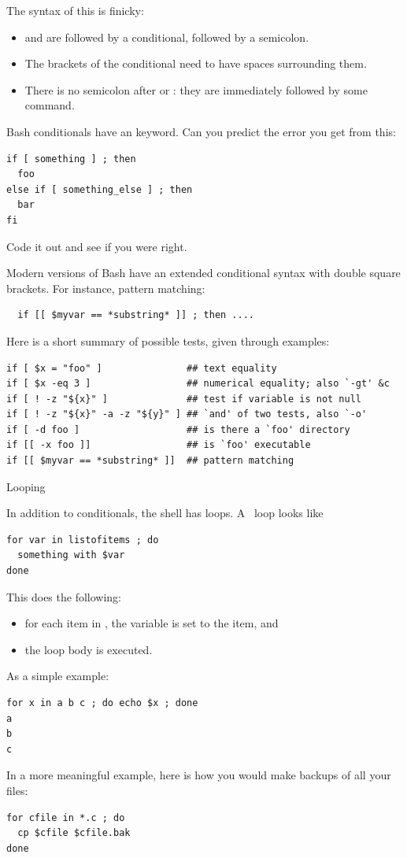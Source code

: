 The syntax of this is finicky:
\begin{itemize}
\item {} and  are followed by a
  conditional, followed by a semicolon.
\item The brackets of the conditional need to have spaces surrounding
  them.
\item There is no semicolon after  or :
  they are immediately followed by some command.
\end{itemize}

\begin{exercise}
  Bash conditionals have an  keyword.
  Can you predict the error you get from this:
\begin{lstlisting}
if [ something ] ; then
  foo
else if [ something_else ] ; then
  bar
fi
\end{lstlisting}
Code it out and see if you were right.
\end{exercise}

Modern versions of Bash have an extended conditional syntax
with double square brackets.
For instance, pattern matching:
\begin{lstlisting}
  if [[ $myvar == *substring* ]] ; then ....
\end{lstlisting}

Here is a short summary of possible tests,
given through examples:
\begin{lstlisting}
if [ $x = "foo" ]               ## text equality
if [ $x -eq 3 ]                 ## numerical equality; also `-gt' &c
if [ ! -z "${x}" ]              ## test if variable is not null
if [ ! -z "${x}" -a -z "${y}" ] ## `and' of two tests, also `-o'
if [ -d foo ]                   ## is there a `foo' directory
if [[ -x foo ]]                 ## is `foo' executable
if [[ $myvar == *substring* ]]  ## pattern matching
\end{lstlisting}

 {Looping}
\label{sec:unix-loop}

In addition to conditionals,
the shell has loops. A~ loop looks like
\begin{lstlisting}
for var in listofitems ; do
  something with $var
done
\end{lstlisting}
This does the following:
\begin{itemize}
\item for each item in , the variable  is set to the
  item, and
\item the loop body is executed.
\end{itemize}
As a simple example:
\begin{lstlisting}
for x in a b c ; do echo $x ; done
a
b
c
\end{lstlisting}
In a more meaningful example,
here is how you would make backups of all your~
files:
\begin{lstlisting}
for cfile in *.c ; do
  cp $cfile $cfile.bak
done
\end{lstlisting}


